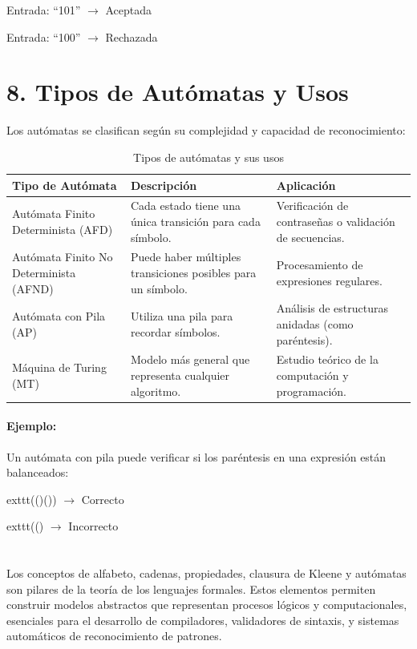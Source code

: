 \documentclass{article}
\begin{document}
Entrada: ``101'' \(\to\) Aceptada

Entrada: ``100'' \(\to\) Rechazada

\section{8. Tipos de Autómatas y Usos}

Los autómatas se clasifican según su complejidad y capacidad de reconocimiento:

\begin{table}[!ht]
\centering
\begin{tabular}{|l|l|l|}
\hline
Tipo de Autómata & Descripción & Aplicación \\
\hline
Autómata Finito Determinista (AFD) & Cada estado tiene una única transición para cada símbolo. & Verificación de contraseñas o validación de secuencias. \\
\hline
Autómata Finito No Determinista (AFND) & Puede haber múltiples transiciones posibles para un símbolo. & Procesamiento de expresiones regulares. \\
\hline
Autómata con Pila (AP) & Utiliza una pila para recordar símbolos. & Análisis de estructuras anidadas (como paréntesis). \\
\hline
Máquina de Turing (MT) & Modelo más general que representa cualquier algoritmo. & Estudio teórico de la computación y programación. \\
\hline
\end{tabular}
\caption{Tipos de autómatas y sus usos}
\end{table}

\paragraph{Ejemplo:}
Un autómata con pila puede verificar si los paréntesis en una expresión están balanceados:


  exttt{(()())} \(\to\) Correcto

  exttt{(()} \(\to\) Incorrecto

\section{}

Los conceptos de alfabeto, cadenas, propiedades, clausura de Kleene y autómatas son pilares de la teoría de los lenguajes formales.
Estos elementos permiten construir modelos abstractos que representan procesos lógicos y computacionales, esenciales para el desarrollo de compiladores, validadores de sintaxis, y sistemas automáticos de reconocimiento de patrones.
\end{document}
